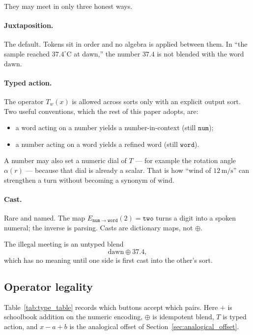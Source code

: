 \documentclass[12pt, a4paper]{article}
\begin{document}
They may meet in only three honest ways.

\paragraph{Juxtaposition.}
The default. Tokens sit in order and no algebra is applied between
them. In ``the sample reached $37.4^\circ\mathrm{C}$ at dawn,'' the
number $37.4$ is not blended with the word $\mathrm{dawn}$.

\paragraph{Typed action.}
The operator $T_w(x)$ is allowed across sorts only with an explicit
output sort. Two useful conventions, which the rest of this paper
adopts, are:
\begin{itemize}
    \item a word acting on a number yields a number-in-context
          (still $\mathtt{num}$);
    \item a number acting on a word yields a refined word
          (still $\mathtt{word}$).
\end{itemize}
A number may also set a numeric dial of $T$ --- for example the
rotation angle $\alpha(r)$ --- because that dial is already a scalar.
That is how ``wind of $12\,\mathrm{m/s}$'' can strengthen a turn
without becoming a synonym of $\mathrm{wind}$.

\paragraph{Cast.}
Rare and named. The map $E_{\mathtt{num}\to\mathtt{word}}(2)=\texttt{two}$
turns a digit into a spoken numeral; the inverse is parsing. Casts are
dictionary maps, not $\oplus$.

The illegal meeting is an untyped blend
\begin{equation}
    \mathrm{dawn} \oplus 37.4,
\end{equation}
which has no meaning until one side is first cast into the other's
sort.

\subsection{Operator legality}
\label{subsec:type_table}
Table~\ref{tab:type_table} records which buttons accept which pairs.
Here $+$ is schoolbook addition on the numeric encoding, $\oplus$ is
idempotent blend, $T$ is typed action, and $x-a+b$ is the analogical
offset of Section~\ref{sec:analogical_offset}.
\end{document}
